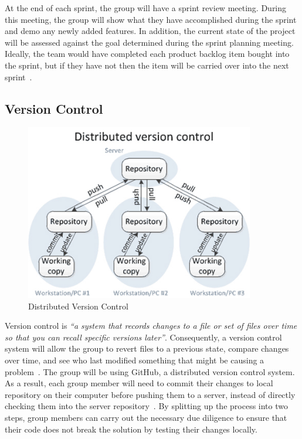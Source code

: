 At the end of each sprint, the group will have a sprint review meeting. During this meeting, the group will show what they have accomplished during the sprint and demo any newly added features. In addition, the current state of the project will be assessed against the goal determined during the sprint planning meeting. Ideally, the team would have completed each product backlog item bought into the sprint, but if they have not then the item will be carried over into the next sprint~\parencite{web:scrum_sprint}.

\subsection{Version Control}

\begin{figure}
  \centering
  \begin{minipage}{10cm}
    \centering
    \includegraphics[width=10cm]{inc/distributed_version_control.jpg}
    \caption{Distributed Version Control}
    \label{fig:distributed_version_control}
  \end{minipage}
\end{figure}

Version control is \emph{``a system that records changes to a file or set of files over time so that you can recall specific versions later''}. Consequently, a version control system will allow the group to revert files to a previous state, compare changes over time, and see who last modified something that might be causing a problem~\parencite{web:git}. The group will be using GitHub, a distributed version control system. As a result, each group member will need to commit their changes to local repository on their computer before pushing them to a server, instead of directly checking them into the server repository~\parencite{book:pro_tfs}. By splitting up the process into two steps, group members can carry out the necessary due diligence to ensure that their code does not break the solution by testing their changes locally.

